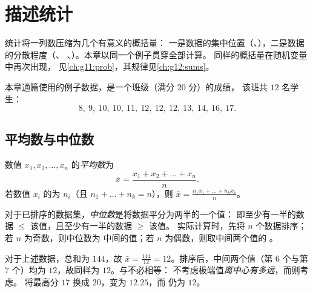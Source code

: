 \chapter{描述统计}\label{ch:g11:stat}

统计将一列数压缩为几个有意义的概括量：
一是数据的集中位置（、），二是数据的分散程度（、
、）。本章以同一个例子贯穿全部计算。
同样的概括量在随机变量中再次出现，
见\cref{ch:g11:prob}，其规律见\cref{ch:g12:sums}。

本章通篇使用的例子数据，是一个班级（满分 $20$ 分）的成绩，
该班共 $12$ 名学生：
\[
8,\ 9,\ 10,\ 10,\ 11,\ 12,\ 12,\ 12,\ 13,\ 14,\ 16,\ 17 .
\]

\section{平均数与中位数}

\begin{definition}[平均数]\label{def:g11:stat:mean}
数值 $x_1, x_2, \dots, x_n$ 的\emph{平均数}为
\[
\bar x = \frac{x_1 + x_2 + \dots + x_n}{n}.
\]
若数值 $x_i$ 的为 $n_i$（且
$n_1 + \dots + n_k = n$），则
$\bar x = \frac{n_1 x_1 + \dots + n_k x_k}{n}$。
\end{definition}

\begin{definition}[中位数]\label{def:g11:stat:median}
对于已排序的数据集，\emph{中位数}是将数据平分为两半的一个值：
即至少有一半的数据 $\leq$ 该值，且至少有一半的数据 $\geq$ 该值。
实际计算时，先将 $n$ 个数据排序；若 $n$ 为奇数，则中位数为
中间的值；若 $n$ 为偶数，则取中间两个值的
。
\end{definition}

\begin{example}\label{ex:g11:stat:meanmedian}
对于上述数据，总和为 $144$，故 $\bar x = \frac{144}{12} =
12$。排序后，中间两个值（第 $6$ 个与第 $7$ 个）均为
$12$，故同样为 $12$。与不必相等：
不考虑极端值\emph{离中心有多远}，而则考虑。
将最高分 $17$ 换成 $20$，变为 $12.25$，而
仍为 $12$。
\end{example}

